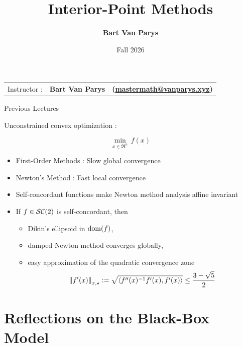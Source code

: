 \documentclass[9pt]{beamer}
\title[Continuous Optimization]{Interior-Point Methods}
\author[]{\textbf{Bart Van Parys}}
\date{Fall 2026}
\begin{document}
\begin{frame}  

  \maketitle

  \vspace{-2em}
  
    \begin{center}
    \begin{tabular}{lll}
      Instructor : & \textbf{Bart Van Parys} & \textbf{(\href{mailto:mastermath@vanparys.xyz}{mastermath@vanparys.xyz})} \\
    \end{tabular}
  \end{center}
  
\end{frame}

\begin{frame}{Previous Lectures}

  Unconstrained convex optimization :
  
  \[
    \min_{x\in\Re^n} \, f(x)
  \]

  \vfill
  
  \begin{itemize}
    \setlength\itemsep{1em}
  \item First-Order Methods : Slow global convergence
  \item Newton's Method : Fast local convergence
  \item Self-concordant functions make Newton method analysis affine invariant
  \item<2-> If $f\in \mathcal{SC}(2)$ is self-concordant, then
    \begin{itemize}
      \setlength\itemsep{0.5em}
    \item Dikin's ellipsoid in $\operatorname{dom}(f)$,
    \item damped Newton method converges globally,
    \item easy approximation of the quadratic convergence zone
      \[
        \left\|f'(x)\right\|_{x,\star}:=\sqrt{\left<f''(x)^{-1}f'(x), f'(x)\right>} \leq \frac{3-\sqrt{5}}{2}
      \]
    \end{itemize}
  \end{itemize}
  
\end{frame}

\section{Reflections on the Black-Box Model}
\end{document}
